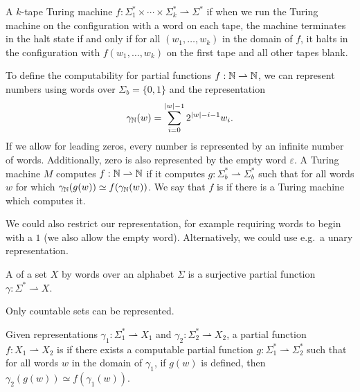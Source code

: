 \begin{definition}
  A $k$-tape Turing machine  $f: \Sigma_1^* \times \cdots \times
  \Sigma_k^* \rightharpoonup \Sigma^*$ if when we run the Turing machine on the
  configuration with a word on each tape, the machine terminates in the halt
  state if and only if for all $(w_1, \ldots, w_k)$ in the domain of $f$, it
  halts in the configuration with $f(w_1, \ldots, w_k)$ on the first tape and
  all other tapes blank.
\end{definition}

\begin{example}
  To define the computability for partial functions $f: \mathbb{N} \rightharpoonup \mathbb{N}$,
  we can represent numbers using words over $\Sigma_b = \{0,1\}$ and the
  representation
  \[
	\gamma_{\mathbb{N}}(w) = \sum_{i=0}^{\left| w \right|-1} 2^{\left| w \right| -i -1} w_i.
  \]
  If we allow for leading zeros, every number is represented by an infinite
  number of words.
  Additionally, zero is also represented by the empty word $\varepsilon$.
  A Turing machine $M$ computes $f: \mathbb{N} \rightharpoonup \mathbb{N}$ if it computes $g:
  \Sigma_b^* \rightharpoonup \Sigma_b^*$ such that for all words $w$ for which
  $\gamma_{\mathbb{N}}(g(w)) \simeq f(\gamma_{\mathbb{N}}(w))$.
  We say that $f$ is  if there is a Turing machine which
  computes it.
\end{example}

We could also restrict our representation, for example requiring words to begin
with a $1$ (we also allow the empty word).
Alternatively, we could use e.g.~a unary representation.

\begin{definition}
  A  of a set $X$ by words over an alphabet $\Sigma$ is a
  surjective partial function $\gamma: \Sigma^* \rightharpoonup X$.
\end{definition}

\begin{remark}
  Only countable sets can be represented.
\end{remark}

\begin{definition}
  Given representations $\gamma_1: \Sigma_1^* \rightharpoonup X_1$ and
  $\gamma_2: \Sigma_2^* \rightharpoonup X_2$, a partial function $f: X_1
  \rightharpoonup X_2$ is  if there
  exists a computable partial function $g: \Sigma_1^* \rightharpoonup \Sigma_2^*$
  such that for all words $w$ in the domain of $\gamma_1$, if $g(w)$ is defined,
  then $\gamma_2(g(w)) \simeq f(\gamma_1(w))$.
\end{definition}

